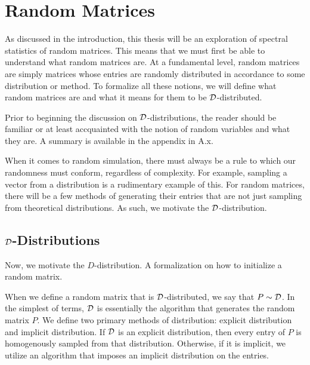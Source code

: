 \chapter{Random Matrices}

As discussed in the introduction, this thesis will be an exploration of spectral statistics of random matrices. This means that we must first be able to understand what random matrices are. At a fundamental level, random matrices are simply matrices whose entries are randomly distributed in accordance to some distribution or method. To formalize all these notions, we will define what random matrices are and what it means for them to be $\D$-distributed.

Prior to beginning the discussion on $\D$-distributions, the reader should be familiar or at least accquainted with the notion of random variables and what they are. A summary is available in the appendix in A.x. 

When it comes to random simulation, there must always be a rule to which our randomness must conform, regardless of complexity. For example, sampling a vector from a distribution is a rudimentary example of this. For random matrices, there will be a few methods of generating their entries that are not just sampling from theoretical distributions. As such, we motivate the $\D$-distribution.

\section{$\D$-Distributions}

Now, we motivate the $D$-distribution. A formalization on how to initialize a random matrix. 

\begin{definition}[$\D$-distribution]
When we define a random matrix that is $\D$-distributed, we say that $P \sim \mathcal{D}$. In the simplest of terms, $\D$ is essentially the algorithm that generates the random matrix $P$. We define two primary methods of distribution: explicit distribution and implicit distribution. If $\D$ is an explicit distribution, then every entry of $P$ is homogenously sampled from that distribution. Otherwise, if it is implicit, we utilize an algorithm that imposes an implicit distribution on the entries. 
\end{definition}

